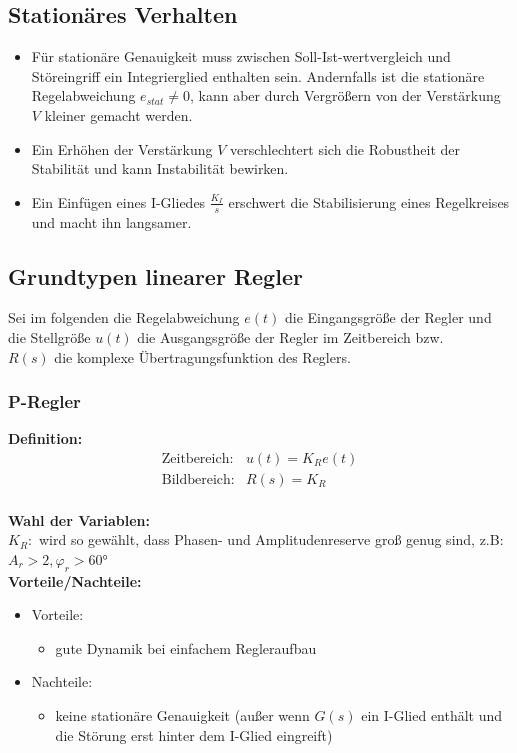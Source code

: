 \documentclass[10pt,a4paper]{article}
\begin{document}
\subsection{Stationäres Verhalten}
\begin{itemize}
	\item Für stationäre Genauigkeit muss zwischen Soll-Ist-wertvergleich und Störeingriff ein Integrierglied enthalten sein. Andernfalls ist die stationäre Regelabweichung $e_{stat} ≠ 0$, kann aber durch Vergrößern von der Verstärkung $V$ kleiner gemacht werden.
	\item Ein Erhöhen der Verstärkung $V$ verschlechtert sich die Robustheit der Stabilität und kann Instabilität bewirken.
	\item Ein Einfügen eines I-Gliedes $\frac{K_I}{s}$ erschwert die Stabilisierung eines Regelkreises und macht ihn langsamer.
\end{itemize}

\subsection{Grundtypen linearer Regler}
Sei im folgenden die Regelabweichung $e(t)$ die Eingangsgröße der Regler und die Stellgröße $u(t)$ die Ausgangsgröße der Regler im Zeitbereich bzw. \\
$R(s)$ die komplexe Übertragungsfunktion des Reglers.

\subsubsection{P-Regler}
\textbf{Definition:}
$$
	\begin{array}{ll}
	\text{Zeitbereich:} & u(t) = K_R e(t) \\
	\text{Bildbereich:} & R(s) = K_R
	\end{array}
$$ \\

\textbf{Wahl der Variablen:} \\
$K_R:$ wird so gewählt, dass Phasen- und Amplitudenreserve groß genug sind, z.B: $A_r > 2, \varphi_r > 60°$ \\

\textbf{Vorteile/Nachteile:}
\begin{itemize}
	\item Vorteile:
	\begin{itemize}
		\item gute Dynamik bei einfachem Regleraufbau
	\end{itemize}
	\item Nachteile:
	\begin{itemize}
		\item keine stationäre Genauigkeit (außer wenn $G(s)$ ein I-Glied enthält und die Störung erst hinter dem I-Glied eingreift)
	\end{itemize}
\end{itemize}
\end{document}
